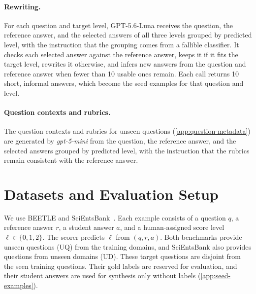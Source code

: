 \paragraph{Rewriting.}
For each question and target level, GPT-5.6-Luna receives the question, the reference answer, and the selected answers of all three levels grouped by predicted level, with the instruction that the grouping comes from a fallible classifier. It checks each selected answer against the reference answer, keeps it if it fits the target level, rewrites it otherwise, and infers new answers from the question and reference answer when fewer than 10 usable ones remain. Each call returns 10 short, informal answers, which become the seed examples for that question and level.

\paragraph{Question contexts and rubrics.}
The question contexts and rubrics for unseen questions (\autoref{app:question-metadata}) are generated by \textit{gpt-5-mini} from the question, the reference answer, and the selected answers grouped by predicted level, with the instruction that the rubrics remain consistent with the reference answer.

\section{Datasets and Evaluation Setup}
\label{app:datasets}

We use BEETLE and SciEntsBank~\citep{dzikovskaSemEval2013Task2013}. Each example consists of a question $q$, a reference answer $r$, a student answer $a$, and a human-assigned score level $\ell \in \{0, 1, 2\}$. The scorer predicts $\ell$ from $(q, r, a)$. Both benchmarks provide unseen questions (UQ) from the training domains, and SciEntsBank also provides questions from unseen domains (UD). These target questions are disjoint from the seen training questions. Their gold labels are reserved for evaluation, and their student answers are used for synthesis only without labels (\autoref{app:seed-examples}).

